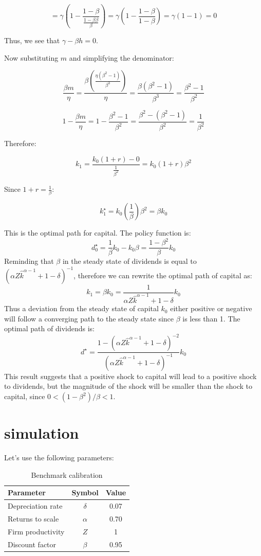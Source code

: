 \documentclass[12pt]{report}
\begin{document}
\[ = \gamma \left( 1 - \frac{1 - \beta}{\frac{1 - \beta \beta}{\beta}} \right) = \gamma \left( 1 - \frac{1 - \beta}{1 -
\beta} \right) = \gamma \left( 1 - 1 \right) = 0 \]


Thus, we see that \( \gamma - \beta h = 0 \).

Now substituting \( m \) and simplifying the denominator:

\[ \frac{\beta m}{\eta} = \frac{\beta \left( \frac{\eta (\beta^2 - 1)}{\beta^3} \right)}{\eta} = \frac{\beta (\beta^2 -
1)}{\beta^3} = \frac{\beta^2 - 1}{\beta^2} \]


\[ 1 - \frac{\beta m}{\eta} = 1 - \frac{\beta^2 - 1}{\beta^2} = \frac{\beta^2 - (\beta^2 - 1)}{\beta^2} =
\frac{1}{\beta^2} \]


Therefore:

\[ k_1 = \frac{k_0 (1 + r) - 0}{\frac{1}{\beta^2}} = k_0 (1 + r) \beta^2 \]

Since \( 1 + r = \frac{1}{\beta} \):

\[ k^{\star}_1 = k_0 \left( \frac{1}{\beta} \right) \beta^2 = \beta k_0 \]

This is the optimal path for capital.
The policy function is:
\[d^{\star}_0=\frac{1}{\beta} k_0 - k_0 \beta = \frac{1 - \beta^2}{\beta} k_0\]
Reminding that \(\beta\) in the steady state of dividends is equal to \((\alpha Z \hat{k}^{\alpha -1}+1-\delta)^{-1}\),
therefore we can rewrite the optimal path of capital as: 
\[k_1 = \beta k_0 = \frac{1}{\alpha Z \hat{k}^{\alpha -1}+1-\delta} k_0 \]
Thus a deviation from the steady state of capital \(k_0\) either positive or negative will follow a converging path to
the steady state since \(\beta\) is less than 1.
The optimal path of dividends is:
\begin{equation}
    d^{\star} = \frac{1-\left(\alpha Z \hat{k}^{\alpha-1}+1-\delta\right)^{-2}}{\left(\alpha Z \hat{k}^{\alpha-1}+1-\delta\right)^{-1}} k_0
\end{equation}
This result suggests that a positive shock to capital will lead to a positive shock to dividends, but the magnitude of
the shock will be smaller than the shock to capital, since \(0<(1-\beta^2)/\beta<1\).
\section{simulation}
Let's use the following parameters:
\begin{table}[H]
    \centering
    \begin{tabular}{lcc}
    \hline Parameter & Symbol & Value \\
    \hline \hline
    Depreciation rate & $\delta$ & 0.07 \\
    Returns to scale & $\alpha$ & 0.70 \\
    Firm productivity & $Z$ & 1 \\
    Discount factor & $\beta$ & 0.95 \\
    \hline
    \end{tabular}
    \caption{Benchmark calibration}
\end{table}
\end{document}
